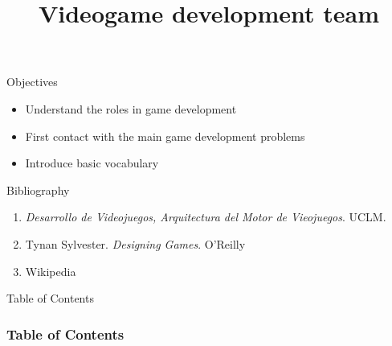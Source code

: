 \documentclass[10pt,compress]{beamer} %
\title[Videogame development team]{Videogame development team}
\author{}
\institute{\asignatura}
\date{}
\begin{document}
{\titlepageBlue
    \begin{frame}
        \titlepage
    \end{frame}
}

\begin{frame}[plain]{}
   \begin{block}{Objectives}
   \begin{itemize}
        \item Understand the roles in game development
        \item First contact with the main game development problems
		\item Introduce basic vocabulary
	\end{itemize}
	\end{block}

   \begin{block}{Bibliography}
      \begin{enumerate}
          \item  \textit{Desarrollo de Videojuegos, Arquitectura del Motor de Vieojuegos}. UCLM.
          \item Tynan Sylvester. \textit{Designing Games}. O'Reilly
          \item Wikipedia
      \end{enumerate} 
   \end{block}
\end{frame}

{
\eliminarNavegacion
\begin{frame}[shrink]{Table of Contents}
 \frametitle{Table of Contents}
 \tableofcontents
\end{frame}
}
\end{document}
